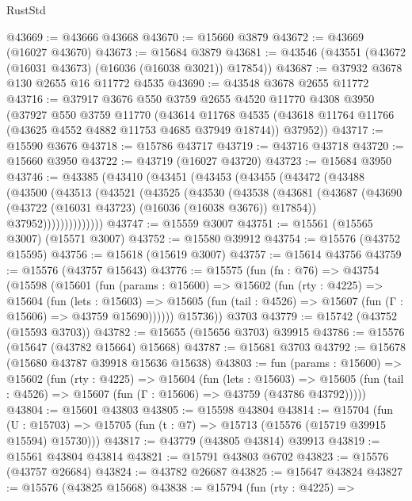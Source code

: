 \begin{lexlean}{RustStd}
\begin{coremodule}
@43669 := @43666 @43668
@43670 := @15660 @3879
@43672 := @43669 (@16027 @43670)
@43673 := @15684 @3879
@43681 := @43546 (@43551 (@43672 (@16031 @43673) (@16036 (@16038 @3021)) @17854))
@43687 := @37932 @3678 @130 @2655 @16 @11772 @4535
@43690 := @43548 @3678 @2655 @11772
@43716 := @37917
    @3676
    @550
    @3759
    @2655
    @4520
    @11770
    @4308
    @3950
    (@37927
      @550
      @3759
      @11770
      (@43614
        @11768
        @4535
        (@43618 @11764 @11766 (@43625 @4552 @4882 @11753 @4685 @37949 @18744))
        @37952))
@43717 := @15590 @3676
@43718 := @15786 @43717
@43719 := @43716 @43718
@43720 := @15660 @3950
@43722 := @43719 (@16027 @43720)
@43723 := @15684 @3950
@43746 := @43385
    (@43410
      (@43451
        (@43453
          (@43455
            (@43472
              (@43488
                (@43500
                  (@43513
                    (@43521
                      (@43525
                        (@43530
                          (@43538
                            (@43681
                              (@43687
                                (@43690 (@43722 (@16031 @43723) (@16036 (@16038 @3676)) @17854))
                                @37952))))))))))))))
@43747 := @15559 @3007
@43751 := @15561 (@15565 @3007) (@15571 @3007)
@43752 := @15580 @39912
@43754 := @15576 (@43752 @15595)
@43756 := @15618 (@15619 @3007)
@43757 := @15614 @43756
@43759 := @15576 (@43757 @15643)
@43776 := @15575
    (fun (fn : @76) =>
    @43754
      (@15598
        (@15601
          (fun (params : @15600) =>
          @15602
            (fun (rty : @4225) =>
            @15604
              (fun (lets : @15603) =>
              @15605 (fun (tail : @4526) => @15607 (fun (Γ : @15606) => @43759 @15690))))))
        @15736))
    @3703
@43779 := @15742 (@43752 (@15593 @3703))
@43782 := @15655 (@15656 @3703) @39915
@43786 := @15576 (@15647 (@43782 @15664) @15668)
@43787 := @15681 @3703
@43792 := @15678 (@15680 @43787 @39918 @15636 @15638)
@43803 := fun (params : @15600) =>
  @15602
    (fun (rty : @4225) =>
    @15604
      (fun (lets : @15603) =>
      @15605 (fun (tail : @4526) => @15607 (fun (Γ : @15606) => @43759 (@43786 @43792)))))
@43804 := @15601 @43803
@43805 := @15598 @43804
@43814 := @15704
    (fun (U : @15703) => @15705 (fun (t : @7) => @15713 (@15576 (@15719 @39915 @15594) @15730)))
@43817 := @43779 (@43805 @43814) @39913
@43819 := @15561 @43804 @43814
@43821 := @15791 @43803 @6702
@43823 := @15576 (@43757 @26684)
@43824 := @43782 @26687
@43825 := @15647 @43824
@43827 := @15576 (@43825 @15668)
@43838 := @15794
    (fun (rty : @4225) =>

\end{coremodule}
\end{lexlean}
